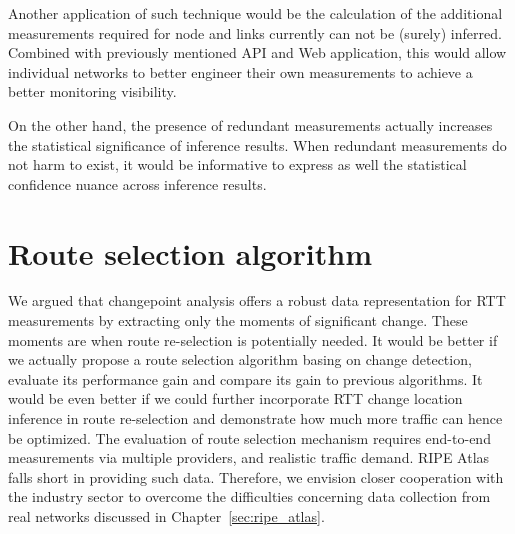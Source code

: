 Another application of such technique would be the calculation of the additional measurements required for node and links currently can not be (surely) inferred. Combined with previously mentioned API and Web application, this would allow individual networks to better engineer their own measurements to achieve a better monitoring visibility. 

On the other hand, the presence of redundant measurements actually increases the statistical significance of inference results. When redundant measurements do not harm to exist, it would be informative to express as well the statistical confidence nuance across inference results.

\section{Route selection algorithm}
We argued that changepoint analysis offers a robust data representation for RTT measurements by extracting only the moments of significant change. These moments are when route re-selection is potentially needed. It would be better if we actually propose a route selection algorithm basing on change detection, evaluate its performance gain and compare its gain to previous algorithms.
It would be even better if we could further incorporate RTT change location inference in route re-selection and demonstrate how much more traffic can hence be optimized.
The evaluation of route selection mechanism requires end-to-end measurements via multiple providers, and realistic traffic demand.
RIPE Atlas falls short in providing such data.
Therefore, we envision closer cooperation with the industry sector to overcome the difficulties concerning data collection from real networks discussed in Chapter~\ref{sec:ripe_atlas}.
 